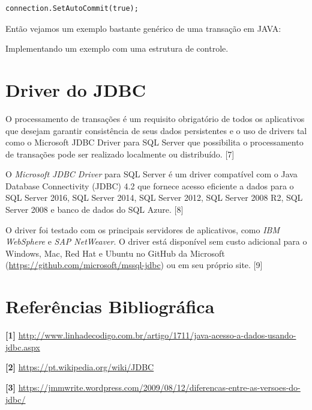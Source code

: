 \documentclass[12pt,a4paper]{article}
\begin{document}
\begin{lstlisting}
connection.SetAutoCommit(true);
\end{lstlisting}

Então vejamos um exemplo bastante genérico de uma transação em JAVA:

 
Implementando um exemplo com uma estrutura de controle.

%

\section{Driver do JDBC}
O processamento de transações é um requisito obrigatório de todos os aplicativos que desejam garantir consistência de seus dados persistentes e o uso de drivers tal como o Microsoft JDBC Driver para SQL Server que possibilita o processamento de transações pode ser realizado localmente ou distribuído. [7]

O \textit{Microsoft JDBC Driver} para SQL Server é um driver compatível com o Java Database Connectivity (JDBC) 4.2 que fornece acesso eficiente a dados para o SQL Server 2016, SQL Server 2014, SQL Server 2012, SQL Server 2008 R2, SQL Server 2008 e banco de dados do SQL Azure. [8]

O driver foi testado com os principais servidores de aplicativos, como \textit{IBM WebSphere} e \textit{SAP NetWeaver}. O driver está disponível sem custo adicional para o Windows, Mac, Red Hat e Ubuntu no GitHub da Microsoft (\url{https://github.com/microsoft/mssql-jdbc}) ou em seu próprio site. [9]


\newpage
\section{Referências Bibliográfica}
\noindent \textbf{[1]} \url {http://www.linhadecodigo.com.br/artigo/1711/java-acesso-a-dados-usando-jdbc.aspx}\\\vspace{0.2cm}

\noindent \textbf{[2] }\url{https://pt.wikipedia.org/wiki/JDBC}\\\vspace{0.2cm}

\noindent \textbf{[3]} \url {https://jmmwrite.wordpress.com/2009/08/12/diferencas-entre-as-versoes-do-jdbc/}\\\vspace{0.2cm}
\end{document}
